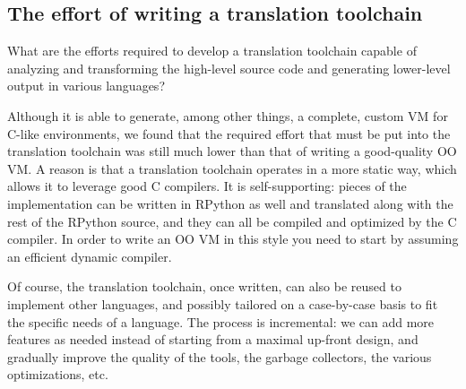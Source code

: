 \documentclass{llncs}
\begin{document}

\subsection{The effort of writing a translation toolchain}

What are the efforts required to develop a translation toolchain capable
of analyzing and transforming the high-level source code and generating
lower-level output in various languages?

Although it is able to generate, among other things, a complete, custom
VM for C-like environments, we found that the required effort that must
be put into the translation toolchain was still much lower than that of
writing a good-quality OO VM.  A reason is that a translation toolchain
operates in a more static way, which allows it to leverage good C
compilers.  It is self-supporting: pieces of the implementation can be
written in RPython as well and translated along with the rest of the
RPython source, and they can all be compiled and optimized by the C
compiler.  In order to write an OO VM in this style you need to start by
assuming an efficient dynamic compiler.

Of course, the translation toolchain, once written, can also be reused
to implement other languages, and possibly tailored on a case-by-case
basis to fit the specific needs of a language.  The process is
incremental: we can add more features as needed instead of starting from
a maximal up-front design, and gradually improve the quality of the
tools, the garbage collectors, the various optimizations, etc.
\end{document}
